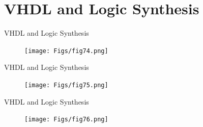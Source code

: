 \documentclass[aspectratio=169]{beamer}
\begin{document}
\section{VHDL and Logic Synthesis}
\begin{frame}{VHDL and Logic Synthesis}
	\justifying
	
	
	\begin{figure}[h]
		\centering
		\texttt{[image: Figs/fig74.png]}
	\end{figure}
	
\end{frame}
\begin{frame}{VHDL and Logic Synthesis}
	\justifying
	
	
	\begin{figure}[h]
		\centering
		\texttt{[image: Figs/fig75.png]}
	\end{figure}
	
\end{frame}
\begin{frame}{VHDL and Logic Synthesis}
	\justifying
	
	
	\begin{figure}[h]
		\centering
		\texttt{[image: Figs/fig76.png]}
	\end{figure}
	
\end{frame}
\end{document}
